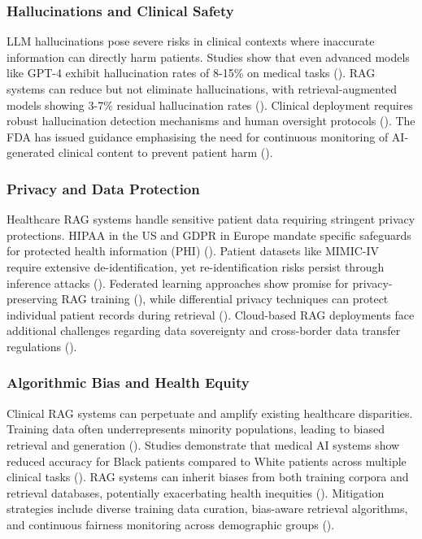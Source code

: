 \subsubsection{Hallucinations and Clinical Safety}
LLM hallucinations pose severe risks in clinical contexts where inaccurate information can directly harm patients. Studies show that even advanced models like GPT-4 exhibit hallucination rates of 8-15\% on medical tasks (\citep{alkaissi2023artificial}). RAG systems can reduce but not eliminate hallucinations, with retrieval-augmented models showing 3-7\% residual hallucination rates (\citep{shuster2021retrieval}). Clinical deployment requires robust hallucination detection mechanisms and human oversight protocols (\citep{ji2023survey}). The FDA has issued guidance emphasising the need for continuous monitoring of AI-generated clinical content to prevent patient harm (\citep{fda2023ai}).

\subsubsection{Privacy and Data Protection}
Healthcare RAG systems handle sensitive patient data requiring stringent privacy protections. HIPAA in the US and GDPR in Europe mandate specific safeguards for protected health information (PHI) (\citep{hipaa2023privacy}). Patient datasets like MIMIC-IV require extensive de-identification, yet re-identification risks persist through inference attacks (\citep{rocher2019estimating}). Federated learning approaches show promise for privacy-preserving RAG training (\citep{li2023federated}), while differential privacy techniques can protect individual patient records during retrieval (\citep{dwork2014differential}). Cloud-based RAG deployments face additional challenges regarding data sovereignty and cross-border data transfer regulations (\citep{gdpr2018regulation}).

\subsubsection{Algorithmic Bias and Health Equity}
Clinical RAG systems can perpetuate and amplify existing healthcare disparities. Training data often underrepresents minority populations, leading to biased retrieval and generation (\citep{rajkomar2018ensuring}). Studies demonstrate that medical AI systems show reduced accuracy for Black patients compared to White patients across multiple clinical tasks (\citep{obermeyer2019dissecting}). RAG systems can inherit biases from both training corpora and retrieval databases, potentially exacerbating health inequities (\citep{chen2023health}). Mitigation strategies include diverse training data curation, bias-aware retrieval algorithms, and continuous fairness monitoring across demographic groups (\citep{mehrabi2021survey}).

